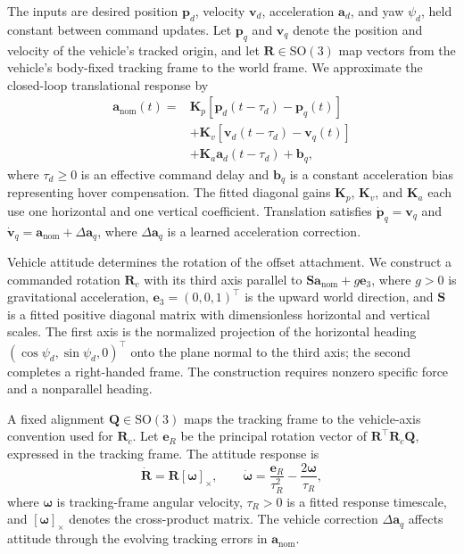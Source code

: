 \documentclass[letterpaper, 10 pt, conference]{ieeeconf}
\begin{document}
The inputs are desired position $\mathbf p_d$, velocity
$\mathbf v_d$, acceleration $\mathbf a_d$, and yaw $\psi_d$,
held constant between command updates. Let $\mathbf p_q$
and $\mathbf v_q$ denote the position and velocity of the
vehicle's tracked origin, and let $\mathbf R\in\mathrm{SO}(3)$
map vectors from the vehicle's body-fixed tracking frame to
the world frame.
We approximate the closed-loop translational response by
\begin{equation}
\begin{aligned}
\mathbf a_{\mathrm{nom}}(t)
={}&\mathbf K_p[\mathbf p_d(t-\tau_d)-\mathbf p_q(t)]\\
&+\mathbf K_v[\mathbf v_d(t-\tau_d)-\mathbf v_q(t)]\\
&+\mathbf K_a\mathbf a_d(t-\tau_d)+\mathbf b_q,
\end{aligned}
\label{eq:quadrotor_response}
\end{equation}
where $\tau_d\geq0$ is an effective command delay and
$\mathbf b_q$ is a constant acceleration bias representing hover
compensation. The fitted diagonal gains $\mathbf K_p$,
$\mathbf K_v$, and $\mathbf K_a$ each use one horizontal and one vertical
coefficient. Translation satisfies
$\dot{\mathbf p}_q=\mathbf v_q$ and
$\dot{\mathbf v}_q=\mathbf a_{\mathrm{nom}}+\Delta\mathbf a_q$,
where $\Delta\mathbf a_q$ is a learned acceleration correction.

Vehicle attitude determines the rotation of the offset attachment.
We construct a commanded rotation $\mathbf R_c$ with its third
axis parallel to
$\mathbf S\mathbf a_{\mathrm{nom}}+g\mathbf e_3$,
where $g>0$ is gravitational acceleration,
$\mathbf e_3=(0,0,1)^\top$ is the upward world direction,
and $\mathbf S$ is a fitted positive diagonal matrix with
dimensionless horizontal and vertical scales.
The first axis is the normalized projection of the horizontal
heading $(\cos\psi_d,\sin\psi_d,0)^\top$ onto the plane normal
to the third axis; the second completes a right-handed frame.
The construction requires nonzero specific force and a nonparallel
heading.

A fixed alignment $\mathbf Q\in\mathrm{SO}(3)$ maps the tracking
frame to the vehicle-axis convention used for $\mathbf R_c$.
Let $\mathbf e_R$ be the principal rotation vector of
$\mathbf R^\top\mathbf R_c\mathbf Q$, expressed in the tracking frame.
The attitude response is
\begin{equation}
\dot{\mathbf R}=\mathbf R[\boldsymbol\omega]_\times,
\qquad
\dot{\boldsymbol\omega}=\frac{\mathbf e_R}{\tau_R^2}
-\frac{2\boldsymbol\omega}{\tau_R},
\label{eq:attitude_response}
\end{equation}
where $\boldsymbol\omega$ is tracking-frame angular velocity,
$\tau_R>0$ is a fitted response timescale, and
$[\boldsymbol\omega]_\times$ denotes the cross-product matrix.
The vehicle correction $\Delta\mathbf a_q$ affects attitude
through the evolving tracking errors in $\mathbf a_{\mathrm{nom}}$.
\end{document}
